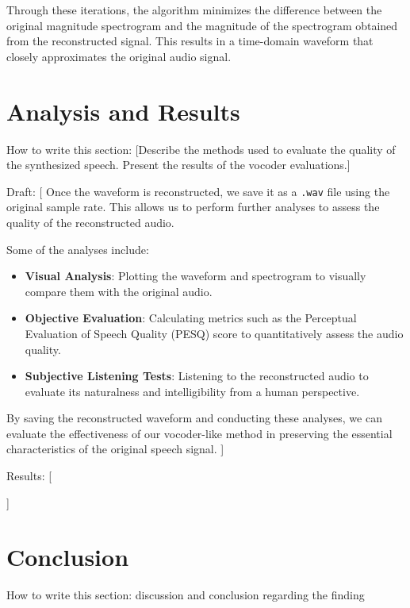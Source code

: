 \documentclass[12pt]{article}
\begin{document}
Through these iterations, the algorithm minimizes the difference between the original magnitude spectrogram and the magnitude of the spectrogram obtained from the reconstructed signal. This results in a time-domain waveform that closely approximates the original audio signal.


\newpage






\section{Analysis and Results}
How to write this section: [Describe the methods used to evaluate the quality of the synthesized speech. Present the results of the vocoder evaluations.]

Draft: [
Once the waveform is reconstructed, we save it as a \texttt{.wav} file using the original sample rate. This allows us to perform further analyses to assess the quality of the reconstructed audio.

Some of the analyses include:

\begin{itemize}
    \item \textbf{Visual Analysis}: Plotting the waveform and spectrogram to visually compare them with the original audio.
    \item \textbf{Objective Evaluation}: Calculating metrics such as the Perceptual Evaluation of Speech Quality (PESQ) score to quantitatively assess the audio quality.
    \item \textbf{Subjective Listening Tests}: Listening to the reconstructed audio to evaluate its naturalness and intelligibility from a human perspective.
\end{itemize}

By saving the reconstructed waveform and conducting these analyses, we can evaluate the effectiveness of our vocoder-like method in preserving the essential characteristics of the original speech signal.
]

Results: [

]


\section{Conclusion}
How to write this section: discussion and conclusion regarding the finding
\end{document}
